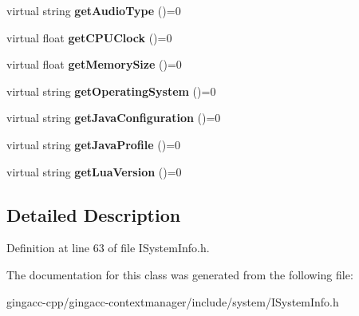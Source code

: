 \begin{CompactItemize}
\item 
virtual string \textbf{getAudioType} ()=0\label{classbr_1_1pucrio_1_1telemidia_1_1ginga_1_1core_1_1contextmanager_1_1ISystemInfo_c7867f94eee199e924cf15e71ca93ef7}

\item 
virtual float \textbf{getCPUClock} ()=0\label{classbr_1_1pucrio_1_1telemidia_1_1ginga_1_1core_1_1contextmanager_1_1ISystemInfo_94a8ab2837eba386d5bba5d995c4b009}

\item 
virtual float \textbf{getMemorySize} ()=0\label{classbr_1_1pucrio_1_1telemidia_1_1ginga_1_1core_1_1contextmanager_1_1ISystemInfo_987546da1d2dc44152eaec8154380359}

\item 
virtual string \textbf{getOperatingSystem} ()=0\label{classbr_1_1pucrio_1_1telemidia_1_1ginga_1_1core_1_1contextmanager_1_1ISystemInfo_59b702d079c36408ae091dd374617c9a}

\item 
virtual string \textbf{getJavaConfiguration} ()=0\label{classbr_1_1pucrio_1_1telemidia_1_1ginga_1_1core_1_1contextmanager_1_1ISystemInfo_b5f7cf50b0f4b81eee19aa953b59144a}

\item 
virtual string \textbf{getJavaProfile} ()=0\label{classbr_1_1pucrio_1_1telemidia_1_1ginga_1_1core_1_1contextmanager_1_1ISystemInfo_dc01f8f54569b771588a0f543799f62d}

\item 
virtual string \textbf{getLuaVersion} ()=0\label{classbr_1_1pucrio_1_1telemidia_1_1ginga_1_1core_1_1contextmanager_1_1ISystemInfo_6efa811f7964d6b4c443bfaccaa476be}

\end{CompactItemize}


\subsection{Detailed Description}




Definition at line 63 of file ISystemInfo.h.

The documentation for this class was generated from the following file:\begin{CompactItemize}
\item 
gingacc-cpp/gingacc-contextmanager/include/system/ISystemInfo.h\end{CompactItemize}
